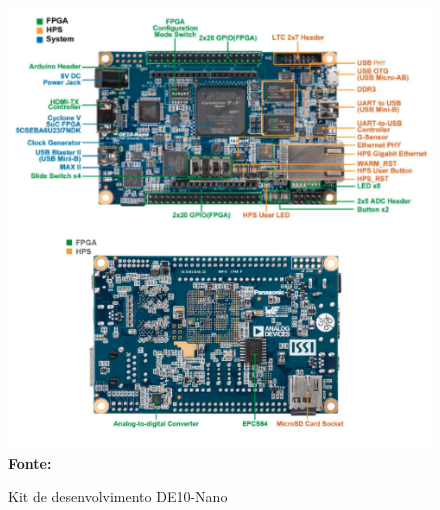 \begin{figure}[ht]
	\caption{Kit de desenvolvimento DE10-Nano}
	\begin{center}
		\includegraphics[scale=0.65]{imagens/de10nano.png}\\
		{\small \textbf{Fonte:}\cite{DE10nano}}
    \end{center}\label{fig:de10-nano}
\end{figure}
